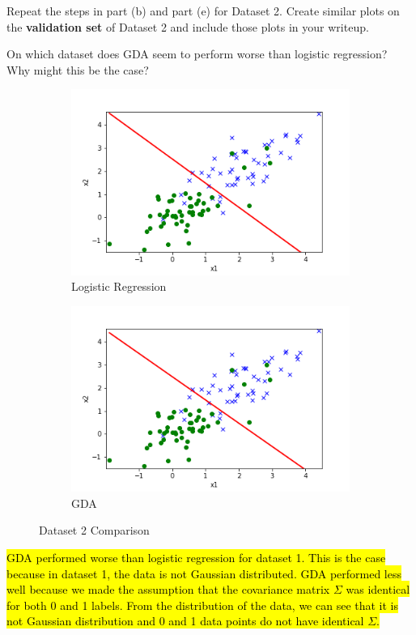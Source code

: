 \item {}
Repeat the steps in part (b) and part (e) for Dataset 2. Create similar plots on
the \textbf{validation set} of Dataset 2 and include those plots in your writeup.

On which dataset does GDA seem to perform worse than logistic regression? Why might this be the case?\\[50pt]

\begin{figure}[H]
    \centering
    \begin{subfigure}{.5\textwidth}
      \centering
      \includegraphics[width=0.95\linewidth]{./linearclass/src/lr_image2.png}
      \caption{Logistic Regression}
    \end{subfigure}%
    \begin{subfigure}{.5\textwidth}
      \centering
      \includegraphics[width=0.95\linewidth]{./linearclass/src/gda_image2.png}
      \caption{GDA}
    \end{subfigure}
    \caption{Dataset 2 Comparison}%
\end{figure}

\hl{GDA performed worse than logistic regression for dataset 1. This is the case because in dataset 1, the data is not Gaussian distributed. GDA performed less well because we made the assumption that the covariance matrix $\Sigma$ was identical for both 0 and 1 labels. From the distribution of the data, we can see that it is not Gaussian distribution and 0 and 1 data points do not have identical $\Sigma$.}
